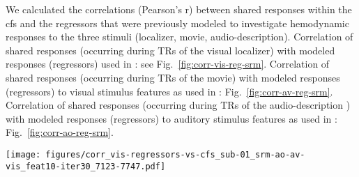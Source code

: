 



We calculated the correlations (Pearson's r) between shared responses within the
\ac{cfs} and the regressors that were previously modeled
\citep{sengupta2016extension, haeusler2022processing} to investigate hemodynamic
responses to the three stimuli (localizer, movie, audio-description).
%
Correlation of shared responses (occurring during TRs of the visual localizer)
with modeled responses (regressors) used in \citep{sengupta2016extension}: see
Fig.~\ref{fig:corr-vis-reg-srm}.
%
Correlation of shared responses (occurring during TRs of the movie) with modeled
responses (regressors) to visual stimulus features as used in
\citep{haeusler2022processing}: Fig.~\ref{fig:corr-av-reg-srm}.
%
Correlation of shared responses (occurring during TRs of the audio-description )
with modeled responses (regressors) to auditory stimulus features as used in
\citep{haeusler2022processing}: Fig.~\ref{fig:corr-ao-reg-srm}.



\begin{figure*}[tbp]
\centering
\texttt{[image: figures/corr\_vis-regressors-vs-cfs\_sub-01\_srm-ao-av-vis\_feat10-iter30\_7123-7747.pdf]}
    \caption{
    \textbf{Correlations of shared responses and regressors of the visual
    localizer.
    }
    Pearson correlation coefficients between a) shared responses (sh. res.)
    within the \ac{cfs} that was calculated for subject 01 and b) regressors
    created in \citet{sengupta2016extension} to model hemodynamic responses
    during the six-category visual localizer paradigm.
    \texttt{geo\&groom} and \texttt{geo\&groom\&furn} are combination of
    regressors (as used on the positive side of contrasts).
    The time series of the \ac{cfs} were sliced to match the TRs of the
    visual localizer.
}
    \label{fig:corr-vis-reg-srm}
\end{figure*}



